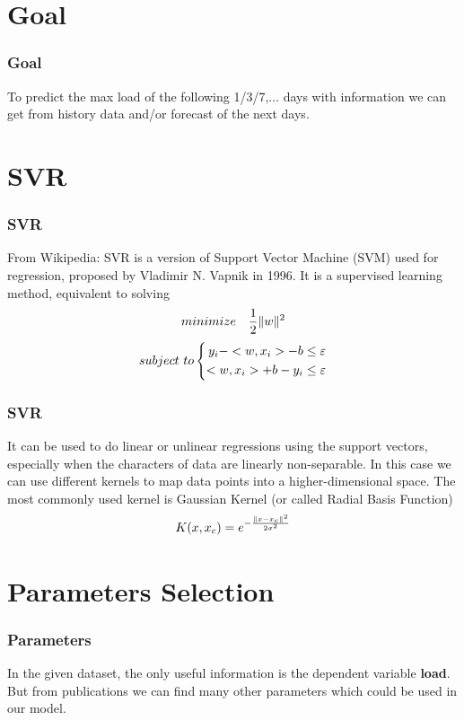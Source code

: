 

\section{Goal}
\begin{frame}
\frametitle{Goal}
To predict the max load of the following 1/3/7,... days with information we can get from history data and/or forecast of the next days.
\end{frame}

\section{SVR} %
\begin{frame}
\frametitle{SVR}
\begin{block}{From Wikipedia:}
SVR is a version of Support Vector Machine (SVM) used for regression, proposed by Vladimir N. Vapnik in 1996. It is a supervised learning method, equivalent to solving
$$minimize\quad \frac{1}{2}\Vert w \Vert^2$$
$$subject\ to \left\{ \begin{aligned} y_i - <w, x_i> - b\leq \varepsilon \\ <w, x_i>+b-y_i\leq \varepsilon \end{aligned} \right.$$
\end{block}
\end{frame}

\begin{frame}
\frametitle{SVR}
It can be used to do linear or unlinear regressions using the support vectors, especially when the characters of data are linearly non-separable. In this case we can use different kernels to map data points into a higher-dimensional space. The most commonly used kernel is Gaussian Kernel (or called Radial Basis Function)
$$K(x, x_c) = e^{-\frac{\Vert x-x_c \Vert^2}{2\sigma^2}}$$
\end{frame}

\section{Parameters Selection}
\begin{frame}
\frametitle{Parameters}
In the given dataset, the only useful information is the dependent variable \textbf{load}.
But from publications we can find many other parameters which could be used in our model.
\end{frame}

